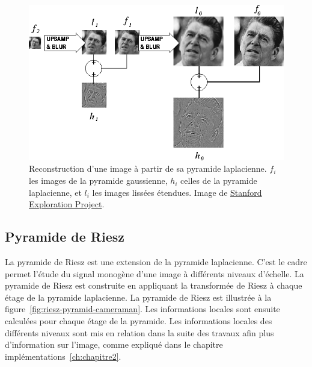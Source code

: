 \begin{figure}
    \centering
    \includegraphics[width=.85\textwidth]{contenu/resources/images/laplacian_pyramid_reconstruction}
    \caption[Reconstruction d'une image à partir de sa pyramide laplacienne]{Reconstruction d'une image à partir de sa pyramide laplacienne. $f_i$ les images de la pyramide gaussienne, $h_i$ celles de la pyramide laplacienne, et $l_i$ les images lissées étendues. Image de \href{https://web.archive.org/web/20230203082428/http://sepwww.stanford.edu/data/media/public/sep/morgan/texturematch/paper_html/node3.html}{Stanford Exploration Project}.}
    \label{fig:laplace-reconstruction}
\end{figure}

\subsection{Pyramide de Riesz}

La pyramide de Riesz est une extension de la pyramide laplacienne. C'est le cadre permet l'étude du signal monogène d'une image à différents niveaux d'échelle. La pyramide de Riesz est construite en appliquant la transformée de Riesz à chaque étage de la pyramide laplacienne. La pyramide de Riesz est illustrée à la figure~\ref{fig:riesz-pyramid-cameraman}. Les informations locales sont ensuite calculées pour chaque étage de la pyramide. Les informations locales des différents niveaux sont mis en relation dans la suite des travaux afin plus d'information sur l'image, comme expliqué dans le chapitre implémentations~\ref{ch:chapitre2}.

\bigskip

